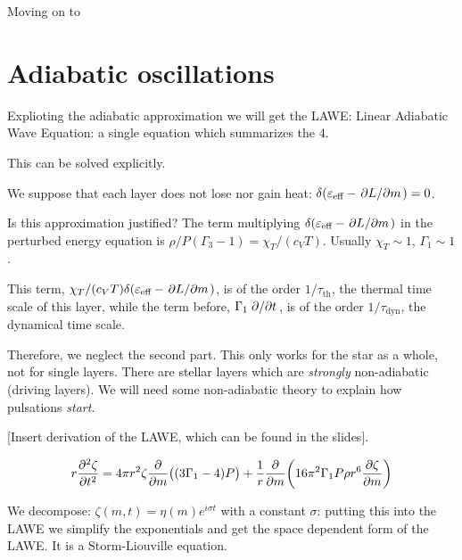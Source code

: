 \documentclass[main.tex]{subfiles}
\begin{document}
Moving on to

\section{Adiabatic oscillations}

Explioting the adiabatic approximation we will get the LAWE: Linear Adiabatic Wave Equation: a single equation which summarizes the 4.

This can be solved explicitly.

We suppose that each layer does not lose nor gain heat: \(\delta (\varepsilon_{\text{eff}} - \pdv*{L}{m} )=0\).

Is this approximation justified? The term multiplying \(\delta (\varepsilon_{\text{eff}} - \pdv*{L}{m} )\) in the perturbed energy equation is \(\rho/P (\Gamma_3-1) = \chi_T / (c_V T)\).
Usually \(\chi_T \sim 1\), \(\Gamma_1 \sim 1\).

This term,  \( \chi_T / (c_V T) \delta (\varepsilon_{\text{eff}} - \pdv*{L}{m} )\), is of the order \(1/\tau_{\text{th}}\), the thermal time scale of this layer, while the term before, \(\Gamma_1 \pdv*{}{t} (\delta \rho / \rho)\), is of the order \(1/\tau_{\text{dyn}}\), the dynamical time scale.

Therefore, we neglect the second part.
This only works for the star as a whole, not for single layers.
There are stellar layers which are \emph{strongly} non-adiabatic (driving layers). We will need some non-adiabatic theory to explain how pulsations \emph{start}.

[Insert derivation of the LAWE, which can be found in the slides].

\begin{equation}
  r \pdv[2]{\zeta}{t} =
  4 \pi r^2 \zeta \pdv{}{m} \qty((3 \Gamma_1 - 4)P)+
  \frac{1}{r} \pdv{}{m} \qty(16 \pi^2 \Gamma_1 P \rho r^6 \pdv{\zeta}{m} )
\end{equation}

We decompose: \(\zeta(m, t) = \eta(m) e^{i \sigma t}\) with a constant \(\sigma\): putting this into the LAWE we simplify the exponentials and get the space dependent form of the LAWE.
It is a Storm-Liouville equation.
\end{document}
